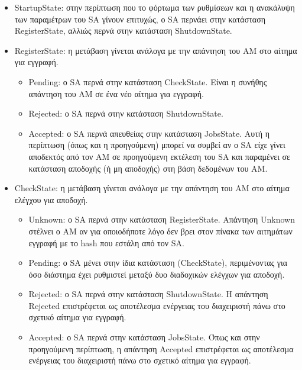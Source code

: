\documentclass[a4paper,11pt]{article}
\begin{document}
\begin{sloppypar}
\begin{itemize}

\item StartupState: στην περίπτωση που το φόρτωμα των ρυθμίσεων και η ανακάλυψη των παραμέτρων του SA γίνουν επιτυχώς, ο SA περνάει στην κατάσταση RegisterState, αλλιώς περνά στην κατάσταση ShutdownState.

\item RegisterState: η μετάβαση γίνεται ανάλογα με την απάντηση του AM στο αίτημα για εγγραφή.
\begin{itemize}

\item Pending: ο SA περνά στην κατάσταση CheckState. Είναι η συνήθης απάντηση του AM σε ένα νέο αίτημα για εγγραφή.

\item Rejected: ο SA περνά στην κατάσταση ShutdownState.

\item Accepted: ο SA περνά απευθείας στην κατάσταση JobsState. Αυτή η περίπτωση (όπως και η προηγούμενη) μπορεί να συμβεί αν ο SA είχε γίνει αποδεκτός από τον AM σε προηγούμενη εκτέλεση του SA και παραμένει σε κατάσταση αποδοχής (ή μη αποδοχής) στη βάση δεδομένων του AM.

\end{itemize} 

\newpage


\item CheckState: η μετάβαση γίνεται ανάλογα με την απάντηση του AM στο αίτημα ελέγχου για αποδοχή.
\begin{itemize}

\item Unknown: ο SA περνά στην κατάσταση RegisterState. Απάντηση Unknown στέλνει ο AM αν για οποιοδήποτε λόγο δεν βρει στον πίνακα των αιτημάτων εγγραφή με το hash που εστάλη από τον SA.

\item Pending: ο SA μένει στην ίδια κατάσταση (CheckState), περιμένοντας για όσο διάστημα έχει ρυθμιστεί μεταξύ δυο διαδοχικών ελέγχων για αποδοχή.

\item Rejected: ο SA περνά στην κατάσταση ShutdownState. Η απάντηση Rejected επιστρέφεται ως αποτέλεσμα ενέργειας του διαχειριστή πάνω στο σχετικό αίτημα για εγγραφή.

\item Accepted: ο SA περνά στην κατάσταση JobsState. Όπως και στην προηγούμενη περίπτωση, η απάντηση Accepted επιστρέφεται ως αποτέλεσμα ενέργειας του διαχειριστή πάνω στο σχετικό αίτημα για εγγραφή.


\end{itemize}
\end{itemize}
\end{sloppypar}
\end{document}
